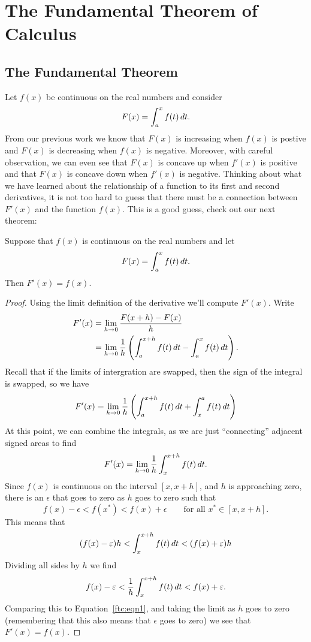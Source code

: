 \chapter{The Fundamental Theorem of Calculus}

\section{The Fundamental Theorem}

Let $f(x)$ be continuous on the real numbers and consider
\[
  F(x) = \int_a^x f(t)\, d t.
\]
From our previous work we know that $F(x)$ is increasing when $f(x)$
is postive and $F(x)$ is decreasing when $f(x)$ is negative. Moreover,
with careful observation, we can even see that $F(x)$ is concave up
when $f'(x)$ is positive and that $F(x)$ is concave down when $f'(x)$
is negative. Thinking about what we have learned about the
relationship of a function to its first and second derivatives, it is
not too hard to guess that there must be a connection between $F'(x)$
and the function $f(x)$. This is a good guess, check out our next
theorem:


\begin{mainTheorem}
\label{thm:fundamental_theorem_I}\hfil

\noindent Suppose that $f(x)$ is continuous on the real numbers and let
\[
  F(x)=\int_a^x f(t)\, d t.
\]
Then $F'(x)=f(x)$.
\end{mainTheorem}

\begin{proof}
Using the limit definition of the derivative we'll compute $F'(x)$.
Write
\begin{align*}
F'(x) &= \lim_{h\to 0}\frac{F(x+h)-F(x)}{h}\\ 
&=\lim_{h\to 0}\frac{1}{h}\left( \int_a^{x+h} f(t)\, d t - \int_a^x f(t)\, d t\right).
\end{align*}
Recall that if the limits of intergration are swapped, then the sign
of the integral is swapped, so we have
\[
F'(x) =\lim_{h\to 0} \frac{1}{h}\left( \int_a^{x+h} f(t)\, d t + \int_x^a f(t)\, d t\right)
\]
At this point, we can combine the integrals, as we are just ``connecting'' adjacent signed areas to find
\begin{equation}\label{ftc:eqn1}
F'(x)=\lim_{h\to 0} \frac{1}{h}\int_x^{x+h} f(t)\d t.
\end{equation}
Since $f(x)$ is continuous on the interval $[x,x+h]$, and $h$ is
approaching zero, there is an $\epsilon$ that goes to zero as $h$ goes
to zero such that
\[
f(x)-\epsilon < f(x^*) < f(x) + \epsilon \qquad \text{for all }x^*\in[x,x+h].
\]
This means that 
\[
(f(x) - \varepsilon)h < \int_x^{x+h} f(t)\, d t < (f(x) + \varepsilon)h
\]
Dividing all sides by $h$ we find
\[
f(x) - \varepsilon < \frac{1}{h}\int_x^{x+h} f(t)\, d t < f(x) + \varepsilon.
\]
Comparing this to Equation~\ref{ftc:eqn1}, and taking the limit as $h$
goes to zero (remembering that this also means that $\epsilon$ goes to
zero) we see that $F'(x) = f(x)$.
\end{proof}

